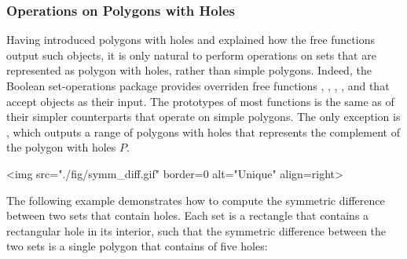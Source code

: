 \subsubsection{Operations on Polygons with Holes\label{bso_sssec:pwh_bops}}

Having introduced polygons with holes and explained how the free functions
output such objects, it is only natural to perform operations on sets that
are represented as polygon with holes, rather than simple polygons.
Indeed, the Boolean set-operations package provides overriden free functions
, , , ,
 and  that accept
 objects as their input. The prototypes of
most functions is the same as of their simpler counterparts that operate
on simple polygons. The only exception is , which
outputs a range of polygons with holes that represents the complement
of the polygon with holes $P$.

\lcTex{%
  \setlength{\BooleanSetOpsWidthRight}{2.5cm}
  \setlength{\BooleanSetOpsWidthLeft}{\BooleanSetOpsWidthLineReal}
  \addtolength{\BooleanSetOpsWidthLeft}{-\BooleanSetOpsWidthRight}
  \begin{minipage}{\BooleanSetOpsWidthLeft}
}
\label{fig:sym_diff}
\begin{ccHtmlOnly}
  <img src="./fig/symm_diff.gif" border=0 alt="Unique" align=right>
\end{ccHtmlOnly}
The following example demonstrates how to compute the symmetric
difference between two sets that contain holes. Each set is a
rectangle that contains a rectangular hole in its interior, such that
the symmetric difference between the two sets is a single polygon that
contains of five holes:

